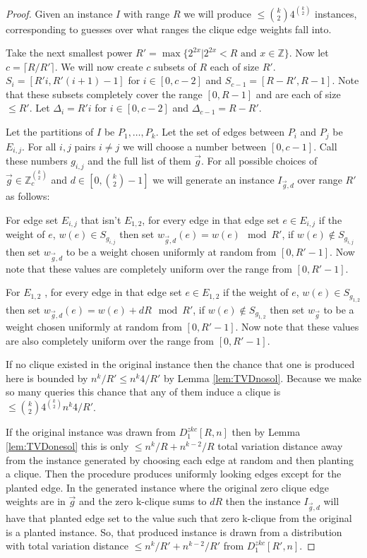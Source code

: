 \begin{proof}
	Given an instance $I$ with range $R$ we will produce $\leq \binom{k}{2}4^{\binom{k}{2}}$ instances, corresponding to guesses over what ranges the clique edge weights fall into. 
	
	Take the next smallest power $R' = \max\{2^{2x}| 2^{2x}<R \text{ and } x\in \mathbb{Z} \} $. 
	Now let $c = \lceil R/R' \rceil$. We will now create $c$ subsets of $R$ each of size $R'$.  $S_i = [R'i,R'(i+1)-1]$ for $i\in [0,c-2]$ and $S_{c-1} = [R-R' , R-1]$. Note that these subsets completely cover the range $[0, R-1]$ and are each of size $\le R'$. Let $\Delta_i = R'i$ for $i\in [0,c-2]$ and $\Delta_{c-1} = R-R'$. 
	
	Let the partitions of $I$ be $P_1, \ldots, P_k$. Let the set of edges between $P_i$ and $P_j$ be $E_{i,j}$. For all $i,j$ pairs $i\ne j$ we will choose a number between $[0,c-1]$. Call these numbers $g_{i,j}$ and the full list of them $\vec{g}$. For all possible choices of $\vec{g} \in \mathbb{Z}_{c}^{\binom{k}{2}}$ and $d \in [0, \binom{k}{2}-1]$ we will generate an instance $I_{\vec{g},d}$ over range $R'$ as follows: 
	
	For edge set $E_{i,j}$ that isn't $E_{1,2}$, for every edge in that edge set $e \in E_{i,j}$ if the weight of $e$, $w(e) \in S_{g_{i,j}}$ then set $w_{\vec{g},d}(e) = w(e) \mod R'$, if $w(e) \nin S_{g_{i,j}}$ then set $w_{\vec{g},d}$ to be a weight chosen uniformly at random from $[0, R'-1]$. Now note that these values are completely uniform over the range from $[0,R'-1]$. 
	
	For $E_{1,2}$ , for every edge in that edge set $e \in E_{1,2}$ if the weight of $e$, $w(e) \in S_{g_{1,2}}$ then set $w_{\vec{g},d}(e) = w(e) + dR \mod R'$, if $w(e) \nin S_{g_{1,2}}$ then set $w_{\vec{g}}$ to be a weight chosen uniformly at random from $[0, R'-1]$. Now note that these values are also completely uniform over the range from $[0,R'-1]$. 
	
	If no clique existed in the original instance then the chance that one is produced here is bounded by $n^k/R' \leq n^k4/R'$ by Lemma \ref{lem:TVDnosol}. Because we make so many queries this chance that any of them induce a clique is $\leq \binom{k}{2}4^{\binom{k}{2}}n^k4/R'$. 
	
	If the original instance was drawn from $D^{zkc}_{1}[R,n]$ then by Lemma \ref{lem:TVDonesol} this is only $\leq n^k/R + n^{k-2}/R$ total variation distance away from the instance generated by choosing each edge at random and then planting a clique. Then the procedure produces uniformly looking edges except for the planted edge. In the generated instance where the original zero clique edge weights are in $\vec{g}$ and the zero k-clique sums to $dR$ then the instance $I_{\vec{g},d}$ will have that planted edge set to the value such that zero k-clique from the original is a planted instance. So, that produced instance is drawn from a distribution with total variation distance $\leq n^k/R' + n^{k-2}/{R'}$ from $D^{zkc}_{1}[R',n]$. 
	

\end{proof}
